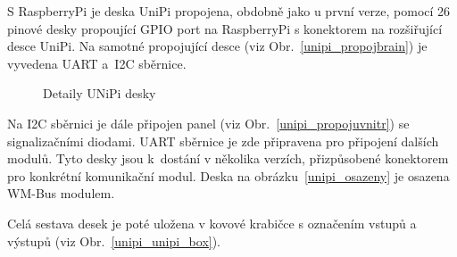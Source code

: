 \newpage

S RaspberryPi je deska UniPi propojena, obdobně jako u první verze, pomocí 26 pinové desky propoující GPIO port na RaspberryPi s konektorem na rozšiřující desce UniPi. Na samotné propojující desce (viz Obr.~\ref{unipi_propojbrain}) je vyvedena UART a~I2C sběrnice. 

\begin{figure}[!ht]
		\vspace{-10pt}
    \centering
			\hspace*{5mm}
			\caption{Detaily UNiPi desky}
			\vspace{-5pt}
\end{figure}

Na I2C sběrnici je dále připojen panel (viz Obr.~\ref{unipi_propojuvnitr}) se signalizačními diodami. UART sběrnice je zde připravena pro připojení dalších modulů. Tyto desky jsou k~dostání v několika verzích, přizpůsobené konektorem pro konkrétní komunikační modul. Deska na obrázku~\ref{unipi_osazeny} je osazena WM-Bus modulem.
 
Celá sestava desek je poté uložena v kovové krabičce s označením vstupů a výstupů (viz Obr.~\ref{unipi_unipi_box}).


